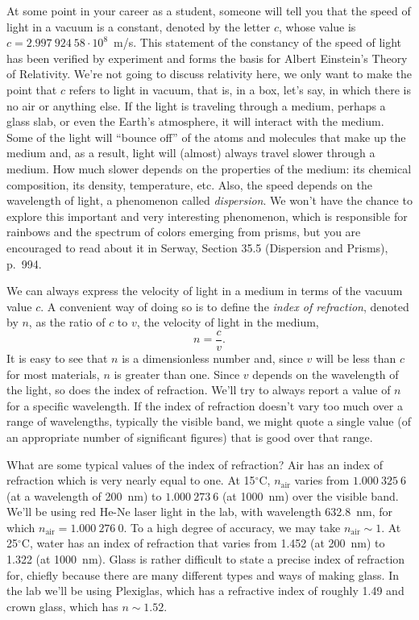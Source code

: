 At some point in your career as a student, someone will tell you that the 
speed of light in a vacuum is a constant, denoted by the letter $c$, whose 
value is $c=2.997~924~58 \cdot 10^8$~m/s.  This statement of the constancy of 
the speed of light has been verified by experiment and forms the basis for
Albert Einstein's Theory of Relativity.  We're not going to discuss relativity
here, we only want to make the point that $c$ refers to light in vacuum, that
is, in a box, let's say, in which there is no air or anything else.  If the
light is traveling through a medium, perhaps a glass slab, or even the Earth's
atmosphere, it will interact with the medium.  Some of the light will ``bounce 
off'' of the atoms and molecules that make up the medium and, as a result,
light will (almost) always travel slower through a medium.  How much slower 
depends on the properties of the medium: its chemical composition, its density,
temperature, etc.  Also, the speed depends on the wavelength of light, a 
phenomenon called {\it dispersion}.  We won't have the chance to explore this
important and very interesting phenomenon, which is responsible for rainbows 
and the spectrum of colors emerging from prisms, but you are encouraged to read
about it in Serway, Section 35.5 (Dispersion and Prisms), p.\ 994.

We can always express the velocity of light in a medium in terms of the vacuum
value $c$.  A convenient way of doing so is to define the {\it index of 
refraction}, denoted by $n$, as the ratio of $c$ to $v$, the velocity of light
in the medium, 
$$ n=\frac{c}{v}. $$ 
It is easy to see that $n$ is a dimensionless number and, since $v$ will be 
less than $c$ for most materials, $n$ is greater than one.  Since $v$ depends 
on the wavelength of the light, so does the index of refraction.  We'll try to
always report a value of $n$ for a specific wavelength.  If the index of 
refraction doesn't vary too much over a range of wavelengths, typically the 
visible band, we might quote a single value (of an appropriate number of 
significant figures) that is good over that range.

What are some typical values of the index of refraction?  Air has an index of
refraction which is very nearly equal to one.  At 15$^\circ$C, 
$n_{\mbox{air}}$ varies from $1.000~325~6$ (at a wavelength of 200~nm) to
$1.000~273~6$   (at 1000~nm) over the visible band. We'll be using red He-Ne 
laser light in the lab, with wavelength 632.8~nm, for which 
$n_{\mbox{air}}=1.000~276~0$.  To a high degree of accuracy, we may take
$n_{\mbox{air}}\sim 1$.  At 25$^\circ$C, water has an index of refraction
that varies from 1.452 (at 200~nm) to 1.322 (at 1000~nm). Glass is rather 
difficult to state a precise index of refraction for, chiefly because there
are many different types and ways of making glass.  In the lab we'll be using
Plexiglas, which has a refractive index of roughly 1.49 and crown glass, which
has $n\sim 1.52$.  

